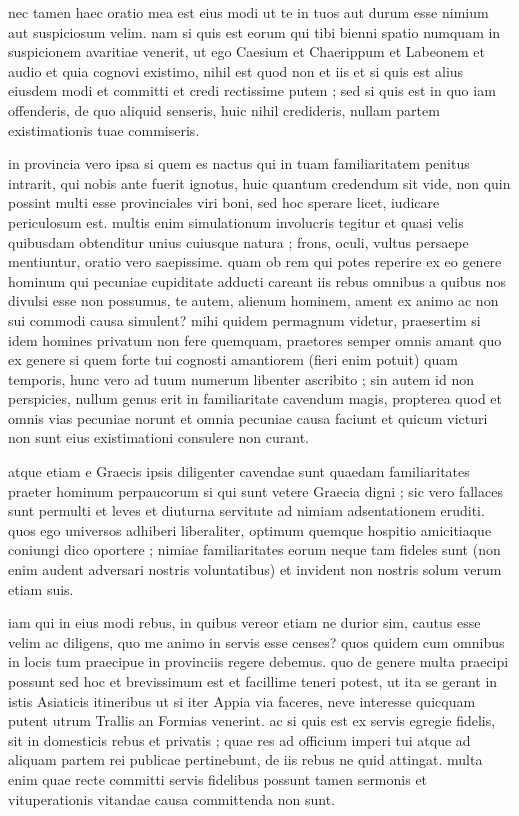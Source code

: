 nec tamen haec oratio mea est eius modi ut te in tuos aut durum esse nimium aut suspiciosum velim. nam si quis est eorum qui tibi bienni spatio numquam in suspicionem avaritiae venerit, ut ego Caesium et Chaerippum et Labeonem et audio et quia cognovi existimo, nihil est quod non et iis et si quis est alius eiusdem modi et committi et credi rectissime putem ; sed si quis est in quo iam offenderis, de quo aliquid senseris, huic nihil credideris, nullam partem existimationis tuae commiseris.

 in provincia vero ipsa si quem es nactus qui in tuam familiaritatem penitus intrarit, qui nobis ante fuerit ignotus, huic quantum credendum sit vide, non quin possint multi esse provinciales viri boni, sed hoc sperare licet, iudicare periculosum est. multis enim simulationum involucris tegitur et quasi velis quibusdam obtenditur unius cuiusque natura ; frons, oculi, vultus persaepe mentiuntur, oratio vero saepissime. quam ob rem qui potes reperire ex eo genere hominum qui pecuniae cupiditate adducti careant iis rebus omnibus a quibus nos divulsi esse non possumus, te autem, alienum hominem, ament ex animo ac non sui commodi causa simulent? mihi quidem permagnum videtur, praesertim si idem homines privatum non fere quemquam, praetores semper omnis amant quo ex genere si quem forte tui cognosti amantiorem (fieri enim potuit) quam temporis, hunc vero ad tuum numerum libenter ascribito ; sin autem id non perspicies, nullum genus erit in familiaritate cavendum magis, propterea quod et omnis vias pecuniae norunt et omnia pecuniae causa faciunt et quicum victuri non sunt eius existimationi consulere non curant.

 atque etiam e Graecis ipsis diligenter cavendae sunt quaedam familiaritates praeter hominum perpaucorum si qui sunt vetere Graecia digni ; sic vero fallaces sunt permulti et leves et diuturna servitute ad nimiam adsentationem eruditi. quos ego universos adhiberi liberaliter, optimum quemque hospitio amicitiaque coniungi dico oportere ; nimiae familiaritates eorum neque tam fideles sunt (non enim audent adversari nostris voluntatibus) et invident non nostris solum verum etiam suis.

 iam qui in eius modi rebus, in quibus vereor etiam ne durior sim, cautus esse velim ac diligens, quo me animo in servis esse censes? quos quidem cum omnibus in locis tum praecipue in provinciis regere debemus. quo de genere multa praecipi possunt sed hoc et brevissimum est et facillime teneri potest, ut ita se gerant in istis Asiaticis itineribus ut si iter Appia via faceres, neve interesse quicquam putent utrum Trallis an Formias venerint. ac si quis est ex servis egregie fidelis, sit in domesticis rebus et privatis ; quae res ad officium imperi tui atque ad aliquam partem rei publicae pertinebunt, de iis rebus ne quid attingat. multa enim quae recte committi servis fidelibus possunt tamen sermonis et vituperationis vitandae causa committenda non sunt.

